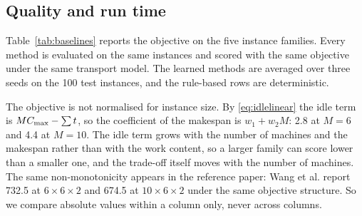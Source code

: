 \subsection{Quality and run time}

Table~\ref{tab:baselines} reports the objective on the five instance
families. Every method is evaluated on the same instances and scored with the
same objective under the same transport model. The learned methods are averaged
over three seeds on the 100 test instances, and the rule-based rows are
deterministic.

The objective is not normalised for instance size. By
\eqref{eq:idlelinear} the idle term is $MC_{\max}-\sum t$, so the coefficient of
the makespan is $w_1+w_2M$: 2.8 at $M=6$ and 4.4 at $M=10$. The idle term grows
with the number of machines and the makespan rather than with the work
content, so a larger family can score lower than a smaller one, and the
trade-off itself moves with the number of machines. The same non-monotonicity
appears in the reference paper: Wang et al. report 732.5 at $6\times6\times2$
and 674.5 at $10\times6\times2$ under the same objective structure. So we
compare absolute values within a column only, never across columns.

